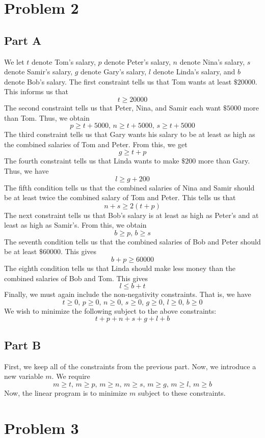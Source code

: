 \documentclass[12pt]{article}
\begin{document}
\section*{Problem 2}
\subsection*{Part A}
We let $t$ denote Tom's salary, $p$ denote Peter's salary, $n$ denote Nina's salary, $s$ denote Samir's salary, $g$ denote Gary's salary, $l$ denote Linda's salary, and $b$ denote Bob's salary. The first constraint tells us that Tom wants at least $ \$20000$. This informs us that
\[
t \geq 20000
\] The second constraint tells us that Peter, Nina, and Samir each want $\$5000$ more than Tom. Thus, we obtain
\[
p \geq t + 5000,\, n \geq t + 5000,\, s \geq t+ 5000
\] The third constraint tells us that Gary wants his salary to be at least as high as the combined salaries of Tom and Peter. From this, we get
\[
g \geq t + p
\] The fourth constraint tells us that Linda wants to make $\$200$ more than Gary. Thus, we have
\[
l \geq g + 200
\] The fifth condition tells us that the combined salaries of Nina and Samir should be at least twice the combined salary of Tom and Peter. This tells us that
\[
n + s \geq 2(t + p)
\] The next constraint tells us that Bob's salary is at least as high as Peter's and at least as high as Samir's. From this, we obtain
\[
b \geq p,\, b \geq s
\] The seventh condition tells us that the combined salaries of Bob and Peter should be at least $\$60000$. This gives
\[
b + p \geq 60000
\] The eighth condition tells us that Linda should make less money than the combined salaries of Bob and Tom. This gives
\[
l \leq b + t
\] Finally, we must again include the non-negativity constraints. That is, we have
\[
t \geq 0,\, p \geq 0,\, n \geq 0,\, s \geq 0,\, g \geq 0,\, l \geq 0,\, b \geq 0
\] We wish to minimize the following subject to the above constraints:
\[
t+p+n+s+g+l+b
\]
\newpage
\subsection*{Part B}
First, we keep all of the constraints from the previous part. Now, we introduce a new variable $m$. We require
\[
m \geq t,\, m \geq p,\, m\geq n,\, m\geq s,\, m \geq g,\, m \geq l,\, m \geq b
\] Now, the linear program is to minimize $m$ subject to these constraints.
\newpage
\section*{Problem 3}
\end{document}
